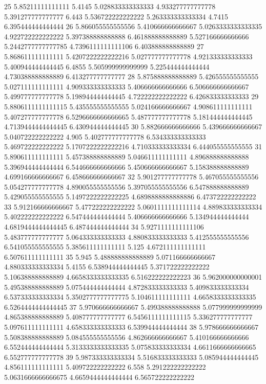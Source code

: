 25 5.85211111111111 5.4145 5.028833333333333 4.933277777777778 5.391277777777777 6.443 5.536722222222222 5.263333333333334 4.7415 6.395444444444444
26 5.866055555555556 5.410666666666667 5.0263333333333335 4.922722222222222 5.397388888888888 6.461888888888889 5.527166666666666 5.2442777777777785 4.7396111111111106 6.403888888888889
27 5.868611111111111 5.4207222222222216 5.027777777777778 4.921333333333333 5.400944444444445 6.4855 5.505999999999999 5.225444444444444 4.730388888888889 6.413277777777777
28 5.875888888888889 5.426555555555555 5.027111111111111 4.909333333333333 5.406666666666666 6.506666666666667 5.499777777777778 5.198944444444445 4.722222222222222 6.426833333333333
29 5.8806111111111115 5.435555555555555 5.024166666666667 4.908611111111111 5.407277777777778 6.5296666666666665 5.487777777777778 5.181444444444445 4.7139444444444445 6.430944444444445
30 5.882666666666666 5.439666666666667 5.040722222222222 4.905 5.402777777777778 6.534333333333333 5.469722222222222 5.1707222222222216 4.710333333333334 6.444055555555555
31 5.890611111111111 5.457388888888889 5.046611111111111 4.896888888888888 5.396944444444444 6.544666666666666 5.450666666666667 5.158388888888889 4.699166666666667 6.458666666666667
32 5.901277777777778 5.467055555555556 5.054277777777778 4.890055555555556 5.397055555555556 6.547888888888889 5.429055555555555 5.1497222222222225 4.6898888888888886 6.473722222222222
33 5.912166666666667 5.477222222222222 5.0601111111111114 4.889833333333334 5.402222222222222 6.547444444444444 5.406666666666666 5.134944444444444 4.6819444444444445 6.487444444444444
34 5.9271111111111106 5.483777777777777 5.064333333333333 4.880833333333333 5.412555555555556 6.541055555555555 5.385611111111111 5.125 4.672111111111111 6.507611111111111
35 5.945 5.488888888888889 5.071166666666667 4.880333333333334 5.4155 6.538944444444445 5.371722222222222 5.106388888888889 4.6658333333333335 6.516222222222223
36 5.962000000000001 5.495388888888889 5.075444444444444 4.872833333333333 5.409833333333334 6.537333333333334 5.3502777777777775 5.104611111111111 4.6658333333333335 6.5264444444444445
37 5.970666666666667 5.499388888888888 5.077999999999999 4.865388888888889 5.408777777777777 6.5456111111111115 5.336277777777777 5.097611111111111 4.658333333333333 6.539944444444444
38 5.978666666666667 5.508388888888889 5.084555555555556 4.862666666666667 5.410166666666666 6.552444444444444 5.3133333333333335 5.075833333333334 4.6611666666666665 6.552777777777778
39 5.987333333333334 5.516833333333333 5.085944444444445 4.856111111111111 5.409722222222222 6.558 5.291222222222222 5.0631666666666675 4.6659444444444444 6.565722222222222

